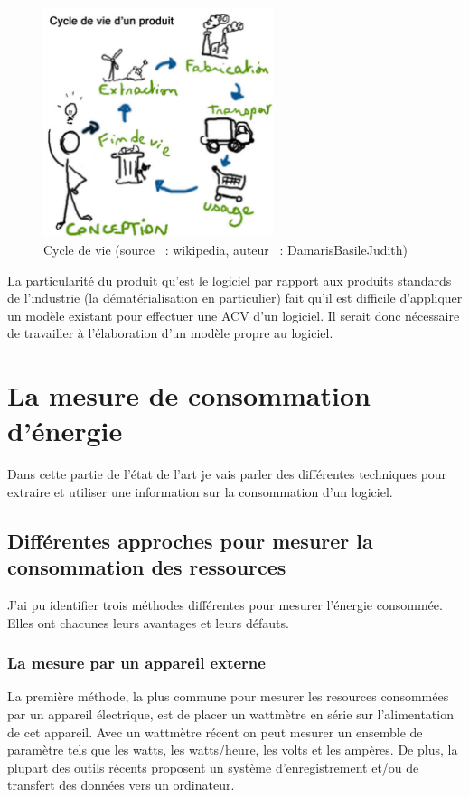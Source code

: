 \documentclass[a4paper, 11pt]{report}
\begin{document}
\begin{figure}
	\centering
	\includegraphics[width=0.6\textwidth]{figures/Cycle-de-vie}
	\caption{Cycle de vie (source ~: wikipedia, auteur ~: DamarisBasileJudith)}
	\label{CdV}
\end{figure}

La particularité du produit qu'est le logiciel par rapport aux produits standards de l'industrie (la dématérialisation en particulier) fait qu'il est difficile d'appliquer un modèle existant pour effectuer une ACV d'un logiciel. Il serait donc nécessaire de travailler à l'élaboration d'un modèle propre au logiciel.
			\subsubsection{}
			
		
	\section{La mesure de consommation d'énergie}
Dans cette partie de l'état de l'art je vais parler des différentes techniques pour extraire et utiliser une information sur la consommation d'un logiciel.
		\subsection{Différentes approches pour mesurer la consommation des ressources}
J'ai pu identifier trois méthodes différentes pour mesurer l'énergie consommée. Elles ont chacunes leurs avantages et leurs défauts.
			\subsubsection{La mesure par un appareil externe}
La première méthode, la plus commune pour mesurer les resources consommées par un appareil électrique, est de placer un wattmètre en série sur l'alimentation de cet appareil. Avec un wattmètre récent on peut mesurer un ensemble de paramètre tels que les watts, les watts/heure, les volts et les ampères. De plus, la plupart des outils récents proposent un système d'enregistrement et/ou de transfert des données vers un ordinateur.
\end{document}
